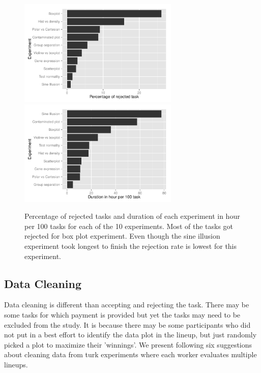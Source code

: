 \documentclass[11pt]{article}
\begin{document}
\begin{figure}[htbp] 
   \centering
   \includegraphics[width=3in]{rejected_task.pdf}
      \includegraphics[width=3in]{task_duration.pdf} 
   \caption{Percentage of rejected tasks and duration of each experiment in hour per 100 tasks for each of the 10 experiments. Most of the tasks got rejected for box plot experiment.  Even though the sine illusion experiment took longest to finish the rejection rate is lowest for this experiment.}
   \label{fig:task_duration}
\end{figure}


\subsection{Data Cleaning} Data cleaning is different than accepting and rejecting the task. There may be some tasks for which payment is provided but yet the tasks may need to be excluded from the study. It is because there may be some participants who did not put in a best effort to identify the data plot in the lineup, but just randomly picked a plot to maximize their 'winnings'. We present following six suggestions about cleaning data from turk experiments where each worker evaluates multiple lineups.  
\end{document}
